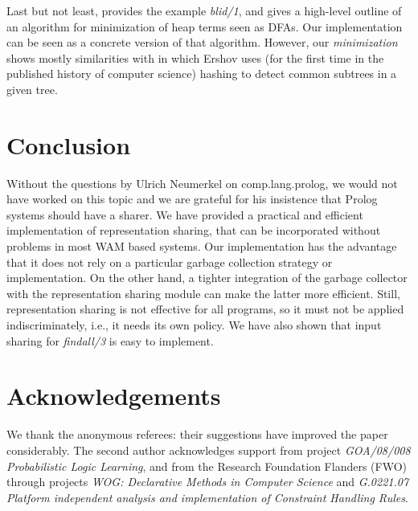 \documentclass{tlp}
\begin{document}
Last but not least, \cite{neumerkeldiplomarbeit} provides the example
{\em blid/1}, and gives a high-level outline of an algorithm for
minimization of heap terms seen as DFAs. Our implementation can be
seen as a concrete version of that algorithm. However, our {\em
  minimization} shows mostly similarities with \cite{ershov58} in
which Ershov uses (for the first time in the published history of
computer science) hashing to detect common subtrees in a given
tree.


\section{Conclusion}\label{conclusion}

Without the questions by Ulrich Neumerkel on comp.lang.prolog, we
would not have worked on this topic and we are grateful for his
insistence that Prolog systems should have a sharer. We have provided
a practical and efficient implementation of representation sharing,
that can be incorporated without problems in most WAM based
systems. Our implementation has the advantage that it does not rely on
a particular garbage collection strategy or implementation. On the
other hand, a tighter integration of the garbage collector with the
representation sharing module can make the latter more
efficient. Still, representation sharing is not effective for all
programs, so it must not be applied indiscriminately, i.e., it needs
its own policy. We have also shown that input sharing for {\em findall/3} is
easy to implement.


\section*{Acknowledgements}

We thank the anonymous referees: their suggestions have improved the
paper considerably. The second author acknowledges support from
project {\em GOA/08/008 Probabilistic Logic Learning}, and from the Research
Foundation Flanders (FWO) through projects {\em WOG: Declarative
Methods in Computer Science} and {\em G.0221.07 Platform independent
analysis and implementation of Constraint Handling Rules}.
\end{document}
